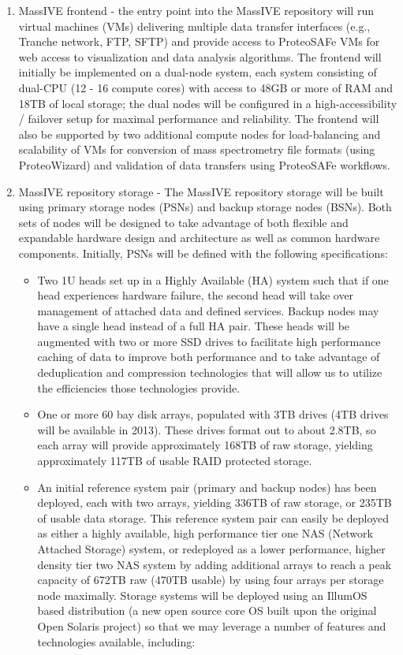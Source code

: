 \documentclass[arial,11pt]{article}
\begin{document}
\begin{enumerate}
\item MassIVE frontend - the entry point into the MassIVE repository will run virtual machines (VMs) delivering multiple data transfer interfaces (e.g., Tranche network, FTP, SFTP) and provide access to ProteoSAFe VMs for web access to visualization and data analysis algorithms. The frontend will initially be implemented on a dual-node system, each system consisting of dual-CPU (12 - 16 compute cores) with access to 48GB or more of RAM and 18TB of local storage; the dual nodes will be configured in a high-accessibility / failover setup for maximal performance and reliability. The frontend will also be supported by two additional compute nodes for load-balancing and scalability of VMs for conversion of mass spectrometry file formats (using ProteoWizard) and validation of data transfers using ProteoSAFe workflows.

\item MassIVE repository storage - The MassIVE repository storage will be built using primary storage nodes (PSNs) and backup storage nodes (BSNs). Both sets of nodes will be designed to take advantage of both flexible and expandable hardware design and architecture as well as common hardware components. Initially, PSNs will be defined with the following specifications:

\begin{itemize}

    \item Two 1U heads set up in a Highly Available (HA) system such that if one head experiences hardware failure, the second head will take over management of attached data and defined services. Backup nodes may have a single head instead of a full HA pair. These heads will be augmented with two or more SSD drives to facilitate high performance caching of data to improve both performance and to take advantage of deduplication and compression technologies that will allow us to utilize the efficiencies those technologies provide.

    \item One or more 60 bay disk arrays, populated with 3TB drives (4TB drives will be available in 2013). These drives format out to about 2.8TB, so each array will provide approximately 168TB of raw storage, yielding approximately 117TB of usable RAID protected storage.

    \item An initial reference system pair (primary and backup nodes) has been deployed, each with two arrays, yielding 336TB of raw storage, or 235TB of usable data storage. This reference system pair can easily be deployed as either a highly available, high performance tier one NAS (Network Attached Storage) system, or redeployed as a lower performance, higher density tier two NAS system by adding additional arrays to reach a peak capacity of 672TB raw (470TB usable) by using four arrays per storage node maximally. Storage systems will be deployed using an IllumOS based distribution (a new open source core OS built upon the original Open Solaris project) so that we may leverage a number of features and technologies available, including:


\end{itemize}
\end{enumerate}
\end{document}
